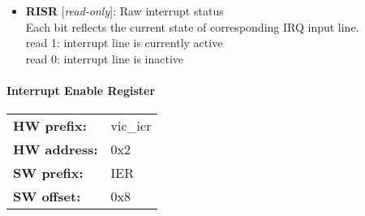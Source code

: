 \vspace{12pt}
\noindent
{}

\begin{itemize}
\item \begin{small}
{\bf 
RISR
} [\emph{read-only}]: Raw interrupt status
\\
Each bit reflects the current state of corresponding IRQ input line. \\                        read 1: interrupt line is currently active \\                        read 0: interrupt line is inactive
\end{small}
\end{itemize}
\paragraph*{Interrupt Enable Register}\vspace{12pt}

\begin{tabular}{l l }
{\bf HW prefix:}  & vic\_ier\\
{\bf HW address:}  & 0x2\\
{\bf SW prefix:}  & IER\\
{\bf SW offset:}  & 0x8\\
\end{tabular}


